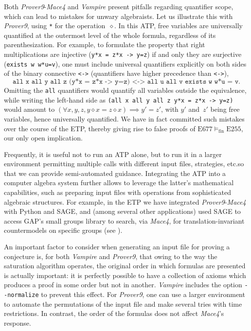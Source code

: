 \documentclass[12pt]{amsart}
\theoremstyle{definition}
\newcommand{\op}{\diamond}
\newcommand{\modelsfin}{\models_{\mathrm{fin}}}
\newcommand{\Eq}[1]{\mathrm{E}#1}
\begin{document}
Both \emph{Prover9}-\emph{Mace4} and \emph{Vampire} present pitfalls regarding quantifier scope, which can lead to mistakes for unwary algebraists.
Let us illustrate this with \emph{Prover9}, using \verb|*| for the operation~$\op$.  In this ATP, free variables are universally quantified at the outermost level of the whole formula, regardless of its parenthesization.
For example, to formulate the property that right multiplications are injective (\texttt{y*x = z*x -> y=z}) if and only they are surjective (\texttt{exists w w*u=v}), one must include universal quantifiers explicitly on both sides of the binary connective \texttt{<->} (quantifiers have higher precedence than \texttt{<->}),
\begin{equation*}
  \texttt{all x all y all z (y*x = z*x -> y=z) <-> all u all v exists w w*u = v.}
\end{equation*}
Omitting the \texttt{all} quantifiers would quantify all variables outside the equivalence, while writing the left-hand side as \texttt{(all x all y all z y*x = z*x -> y=z)} would amount to $(\forall x,y,z, y\op x=z\op x) \implies y'=z'$, with $y'$ and~$z'$ being free variables, hence universally quantified.
We have in fact committed such mistakes over the course of the ETP, thereby giving rise to false proofs of $\Eq{677}\modelsfin\Eq{255}$, our only open implication.

Frequently, it is useful not to run an ATP alone, but to run it in a larger environment permitting multiple calls with different input files, strategies, etc.\@ so that we can provide semi-automated guidance. Integrating the ATP into a computer algebra system further allows to leverage the latter's mathematical capabilities, such as preparing input files with operations from sophisticated algebraic structures. For example, in the ETP we have integrated \emph{Prover9}-\emph{Mace4} with Python and SAGE, and (among several other applications) used SAGE to access GAP's small groups library to search, via \emph{Mace4}, for translation-invariant countermodels on specific groups (see ).

An important factor to consider when generating an input file for proving a conjecture is, for both \emph{Vampire} and \emph{Prover9}, that owing to the way the saturation algorithm operates, the original order in which formulas are presented is actually important: it is perfectly possible to have a collection of axioms which produces a proof in some order but not in another. \emph{Vampire} includes the option \verb|--normalize| to prevent this effect. For \emph{Prover9}, one can use a larger environment to automate the permutations of the input file and make several tries with time restrictions. In contrast, the order of the formulas does not affect \emph{Mace4}'s response.
\end{document}
